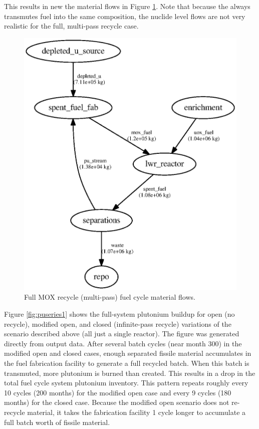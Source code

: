 This results in new the material flows in Figure \ref{fig:flowclosed}. Note
that because the  always transmutes fuel into the same
composition, the nuclide level flows are not very realistic for the full, 
multi-pass
recycle case.

\begin{figure}[H]
\label{fig:flowclosed}
\caption{Full \gls{MOX} recycle (multi-pass) fuel cycle material flows.}
\begin{center}
\includegraphics{./images/flow-closed-1.eps}
\end{center}
\end{figure}

Figure \ref{fig:puseries1} shows the full-system plutonium buildup for open
(no recycle), modified open, and closed (infinite-pass recycle) variations of
the scenario described above (all just a single reactor).  The figure was
generated directly from \Cyclus output data. After several batch cycles (near
month 300) in the modified open and closed cases, enough separated fissile
material accumulates in the fuel fabrication facility to generate a full
recycled batch.  When this batch is transmuted, more plutonium is burned than
created.  This results in a drop in the total fuel cycle system plutonium
inventory.  This pattern repeats roughly every 10 cycles (200 months) for the
modified open case and every 9 cycles (180 months) for the closed case.
Because the modified open scenario does not re-recycle material, it takes the
fabrication facility 1 cycle longer to accumulate a full batch worth of
fissile material. 

